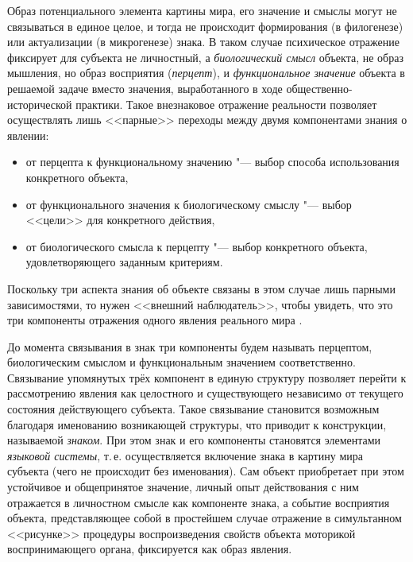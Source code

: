 Образ потенциального элемента картины мира, его значение и смыслы могут не связываться в единое целое, и тогда не происходит формирования (в филогенезе) или актуализации (в микрогенезе) знака. В таком случае психическое отражение фиксирует для субъекта не личностный, а \textit{биологический смысл} объекта, не образ мышления, но образ восприятия (\textit{перцепт}), и \textit{функциональное значение} объекта в решаемой задаче вместо значения, выработанного в ходе общественно-исторической практики. Такое внезнаковое отражение реальности позволяет осуществлять лишь <<парные>> переходы между двумя компонентами знания о явлении: 
\begin{itemize}
	\item от перцепта к функциональному значению "--- выбор способа использования конкретного объекта, 
	\item от функционального значения к биологическому смыслу "--- выбор <<цели>> для конкретного действия, 
	\item от биологического смысла к перцепту "--- выбор конкретного объекта, удовлетворяющего заданным критериям.
\end{itemize}
Поскольку три аспекта знания об объекте связаны в этом случае лишь парными зависимостями, то нужен <<внешний наблюдатель>>, чтобы увидеть, что это три компоненты отражения одного явления реального мира \cite{Chudova2012a}.

До момента связывания в знак три компоненты будем называть перцептом, биологическим смыслом и функциональным значением соответственно. Связывание упомянутых трёх компонент в единую структуру позволяет перейти к рассмотрению явления как целостного и существующего независимо от текущего состояния действующего субъекта. Такое связывание становится возможным благодаря именованию возникающей структуры, что приводит к конструкции, называемой \textit{знаком}. При этом знак и его компоненты становятся элементами \textit{языковой системы}, т.\,е. осуществляется включение знака в картину мира субъекта (чего не происходит без именования). Сам объект приобретает при этом устойчивое и общепринятое значение, личный опыт действования с ним отражается в личностном смысле как компоненте знака, а событие восприятия объекта, представляющее собой в простейшем случае отражение в симультанном <<рисунке>> процедуры воспроизведения свойств объекта моторикой воспринимающего органа, фиксируется как образ явления.



